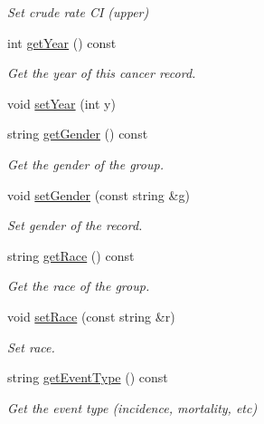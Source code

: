 \begin{DoxyCompactItemize}
\begin{DoxyCompactList}\small\item\em Set crude rate CI (upper) \end{DoxyCompactList}\item 
int \hyperlink{classbridges_1_1dataset_1_1_cancer_incidence_a106905192829e115ed5e1f911d4c8c08}{get\+Year} () const
\begin{DoxyCompactList}\small\item\em Get the year of this cancer record. \end{DoxyCompactList}\item 
void \hyperlink{classbridges_1_1dataset_1_1_cancer_incidence_a833ce8f785d61a5271a2ef949ed76680}{set\+Year} (int y)
\item 
string \hyperlink{classbridges_1_1dataset_1_1_cancer_incidence_a0c4dcbde0ad1f81ffe4016c12d08c4c1}{get\+Gender} () const
\begin{DoxyCompactList}\small\item\em Get the gender of the group. \end{DoxyCompactList}\item 
void \hyperlink{classbridges_1_1dataset_1_1_cancer_incidence_aaf7aa19ce1946af9443e1584e5998e7b}{set\+Gender} (const string \&g)
\begin{DoxyCompactList}\small\item\em Set gender of the record. \end{DoxyCompactList}\item 
string \hyperlink{classbridges_1_1dataset_1_1_cancer_incidence_aacbcdf37d86455d9cbd2a50e9370625e}{get\+Race} () const
\begin{DoxyCompactList}\small\item\em Get the race of the group. \end{DoxyCompactList}\item 
void \hyperlink{classbridges_1_1dataset_1_1_cancer_incidence_ac19844df029b7dc4595205e9660d53e2}{set\+Race} (const string \&r)
\begin{DoxyCompactList}\small\item\em Set race. \end{DoxyCompactList}\item 
string \hyperlink{classbridges_1_1dataset_1_1_cancer_incidence_a964d0fcc125808e457b1fd2f79cf43bf}{get\+Event\+Type} () const
\begin{DoxyCompactList}\small\item\em Get the event type (incidence, mortality, etc) \end{DoxyCompactList}\item 

\end{DoxyCompactItemize}
